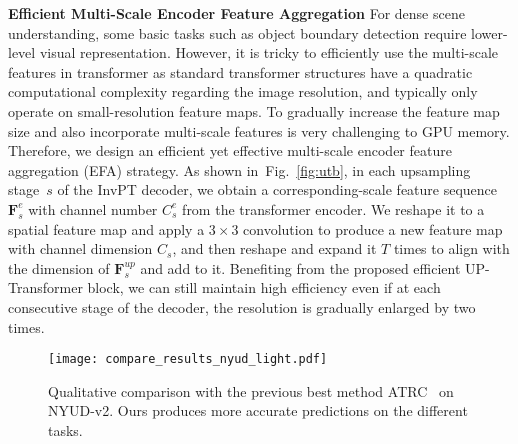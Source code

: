 \documentclass[runningheads]{llncs}
\begin{document}
\par\noindent\textbf{Efficient Multi-Scale Encoder Feature Aggregation}
For dense scene understanding, some basic tasks such as object boundary detection require lower-level visual representation. However, it is tricky to efficiently use the multi-scale features in transformer as standard transformer structures have a quadratic computational complexity regarding the image resolution, and typically only operate on small-resolution feature maps. To gradually increase the feature map size and also incorporate multi-scale features is very challenging to GPU memory.
Therefore, we design an efficient yet effective multi-scale encoder feature aggregation (EFA) strategy. As shown in~Fig.~\ref{fig:utb},
in each upsampling stage~$s$ of the InvPT decoder, we obtain a corresponding-scale feature sequence $\mathbf{F}^e_s$ with channel number $C_s^e$ from the transformer encoder. We reshape it to a spatial feature map and apply a $3\times 3$ convolution to produce a new feature map with channel dimension $C_s$, and then reshape and expand it $T$ times to align with the dimension of $\mathbf{F}_s^{up}$ and add to it. Benefiting from the proposed efficient UP-Transformer block, we can still maintain high efficiency even if at each consecutive stage of the decoder, the resolution is gradually enlarged by two times.


\begin{figure}[!t]
	\centering
	\vspace{-5pt}
	\texttt{[image: compare\_results\_nyud\_light.pdf]}
	\vspace{-0.8em}	
	\caption{Qualitative comparison with the previous best method ATRC~\cite{atrc} on NYUD-v2. Ours produces more accurate predictions on the different tasks.
	}
	\vspace{-20pt}
	\label{fig:qualitative_sota_nyud}
\end{figure}

\vspace{-10pt}
\end{document}
